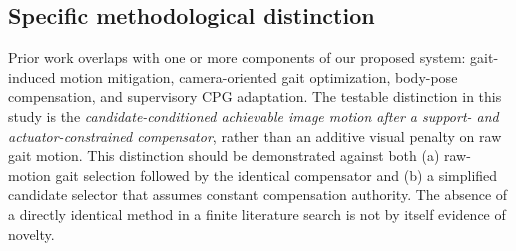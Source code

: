 \subsection{Specific methodological distinction}
Prior work overlaps with one or more components of our proposed system: gait-induced motion mitigation, camera-oriented gait optimization, body-pose compensation, and supervisory CPG adaptation. The testable distinction in this study is the \emph{candidate-conditioned achievable image motion after a support- and actuator-constrained compensator}, rather than an additive visual penalty on raw gait motion. This distinction should be demonstrated against both (a) raw-motion gait selection followed by the identical compensator and (b) a simplified candidate selector that assumes constant compensation authority. The absence of a directly identical method in a finite literature search is not by itself evidence of novelty.
